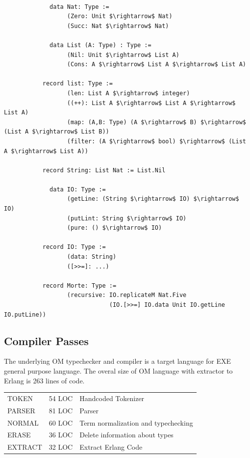 \documentclass[11pt,oneside]{article}
\begin{document}
\begin{lstlisting}[mathescape=true]

             data Nat: Type :=
                  (Zero: Unit $\rightarrow$ Nat)
                  (Succ: Nat $\rightarrow$ Nat)

             data List (A: Type) : Type :=
                  (Nil: Unit $\rightarrow$ List A)
                  (Cons: A $\rightarrow$ List A $\rightarrow$ List A)

           record list: Type :=
                  (len: List A $\rightarrow$ integer)
                  ((++): List A $\rightarrow$ List A $\rightarrow$ List A)
                  (map: (A,B: Type) (A $\rightarrow$ B) $\rightarrow$ (List A $\rightarrow$ List B))
                  (filter: (A $\rightarrow$ bool) $\rightarrow$ (List A $\rightarrow$ List A))

           record String: List Nat := List.Nil

             data IO: Type :=
                  (getLine: (String $\rightarrow$ IO) $\rightarrow$ IO)
                  (putLint: String $\rightarrow$ IO)
                  (pure: () $\rightarrow$ IO)

           record IO: Type :=
                  (data: String)
                  ([>>=]: ...)

           record Morte: Type :=
                  (recursive: IO.replicateM Nat.Five
                              (IO.[>>=] IO.data Unit IO.getLine IO.putLine))

\end{lstlisting}

\subsection{Compiler Passes}

The underlying OM typechecker and compiler is a target language for EXE general purpose language.
The overal size of OM language with extractor to Erlang is 263 lines of code.

\begin{center}
\begin{tabular}{lll}
   TOKEN   & 54 LOC & Handcoded Tokenizer\\
   PARSER  & 81 LOC & Parser\\
   NORMAL  & 60 LOC & Term normalization and typechecking\\
   ERASE   & 36 LOC & Delete information about types\\
   EXTRACT & 32 LOC & Extract Erlang Code\\
\end{tabular}
\end{center}
\end{document}
